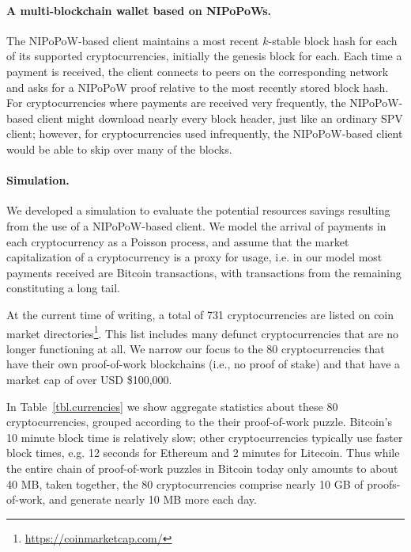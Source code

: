 \paragraph{A multi-blockchain wallet based on NIPoPoWs. }
The NIPoPoW-based client maintains a most recent $k$-stable block hash for each
of its supported cryptocurrencies, initially the genesis block for each. Each
time a payment is received, the client connects to peers on the corresponding
network and asks for a NIPoPoW proof relative to the most recently stored block
hash. For cryptocurrencies where payments are received very frequently, the
NIPoPoW-based client might download nearly every block header, just like an
ordinary SPV client; however, for cryptocurrencies used infrequently, the
NIPoPoW-based client would be able to skip over many of the blocks.

\paragraph{Simulation.}
We developed a simulation to evaluate the potential resources savings resulting
from the use of a NIPoPoW-based client. We model the arrival of payments in
each cryptocurrency as a Poisson process, and assume that the market
capitalization of a cryptocurrency is a proxy for usage, i.e. in our model most
payments received are Bitcoin transactions, with transactions from the
remaining constituting a long tail.

At the current time of writing, a total of 731 cryptocurrencies are listed on
coin market directories\footnote{\url{https://coinmarketcap.com/}}. This list
includes many defunct cryptocurrencies that are no longer functioning at all.
We narrow our focus to the 80 cryptocurrencies that have their own
proof-of-work blockchains
(i.e., no proof of stake) and that have a market cap of over USD \$100,000.

In Table~\ref{tbl.currencies} we show aggregate statistics about these 80 cryptocurrencies, grouped according to the their proof-of-work puzzle.
Bitcoin's 10 minute block time is relatively slow; other cryptocurrencies typically use faster block times, e.g. 12 seconds for Ethereum and 2 minutes for Litecoin. Thus while the entire chain of proof-of-work puzzles in Bitcoin today only amounts to about 40 MB, taken together, the 80 cryptocurrencies comprise nearly 10 GB of proofs-of-work, and generate nearly 10 MB more each day.

